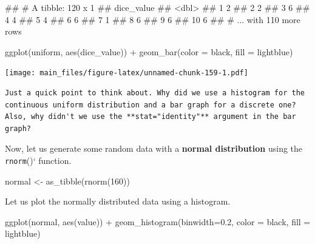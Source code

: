 \documentclass[
]{book}
\newenvironment{Shaded}{\begin{snugshade}}{\end{snugshade}}
\newcommand{\AttributeTok}[1]{\textcolor[rgb]{0.77,0.63,0.00}{#1}}
\newcommand{\DecValTok}[1]{\textcolor[rgb]{0.00,0.00,0.81}{#1}}
\newcommand{\FloatTok}[1]{\textcolor[rgb]{0.00,0.00,0.81}{#1}}
\newcommand{\FunctionTok}[1]{\textcolor[rgb]{0.00,0.00,0.00}{#1}}
\newcommand{\NormalTok}[1]{#1}
\newcommand{\OtherTok}[1]{\textcolor[rgb]{0.56,0.35,0.01}{#1}}
\newcommand{\SpecialCharTok}[1]{\textcolor[rgb]{0.00,0.00,0.00}{#1}}
\newcommand{\StringTok}[1]{\textcolor[rgb]{0.31,0.60,0.02}{#1}}
\begin{document}
\begin{Shaded}
\begin{Highlighting}[]
\NormalTok{\#\# \# A tibble: 120 x 1}
\NormalTok{\#\#    dice\_value}
\NormalTok{\#\#         \textless{}dbl\textgreater{}}
\NormalTok{\#\#  1          2}
\NormalTok{\#\#  2          2}
\NormalTok{\#\#  3          6}
\NormalTok{\#\#  4          4}
\NormalTok{\#\#  5          4}
\NormalTok{\#\#  6          6}
\NormalTok{\#\#  7          1}
\NormalTok{\#\#  8          6}
\NormalTok{\#\#  9          6}
\NormalTok{\#\# 10          6}
\NormalTok{\#\# \# ... with 110 more rows}
\end{Highlighting}
\end{Shaded}

\begin{Shaded}
\begin{Highlighting}[]
\FunctionTok{ggplot}\NormalTok{(uniform, }\FunctionTok{aes}\NormalTok{(dice\_value)) }\SpecialCharTok{+}
  \FunctionTok{geom\_bar}\NormalTok{(}\AttributeTok{color =} \StringTok{\textquotesingle{}black\textquotesingle{}}\NormalTok{,}
           \AttributeTok{fill =} \StringTok{\textquotesingle{}lightblue\textquotesingle{}}\NormalTok{)}
\end{Highlighting}
\end{Shaded}

\texttt{[image: main\_files/figure-latex/unnamed-chunk-159-1.pdf]}

\begin{verbatim}
Just a quick point to think about. Why did we use a histogram for the 
continuous uniform distribution and a bar graph for a discrete one? 
Also, why didn't we use the **stat="identity"** argument in the bar graph?
\end{verbatim}

Now, let us generate some random data with a \textbf{normal distribution} using the \texttt{rnorm}()` function.

\begin{Shaded}
\begin{Highlighting}[]
\NormalTok{normal }\OtherTok{\textless{}{-}} \FunctionTok{as\_tibble}\NormalTok{(}\FunctionTok{rnorm}\NormalTok{(}\DecValTok{160}\NormalTok{))}
\end{Highlighting}
\end{Shaded}

Let us plot the normally distributed data using a histogram.

\begin{Shaded}
\begin{Highlighting}[]
\FunctionTok{ggplot}\NormalTok{(normal, }\FunctionTok{aes}\NormalTok{(value)) }\SpecialCharTok{+}
        \FunctionTok{geom\_histogram}\NormalTok{(}\AttributeTok{binwidth=}\FloatTok{0.2}\NormalTok{,}
                       \AttributeTok{color =} \StringTok{\textquotesingle{}black\textquotesingle{}}\NormalTok{,}
                       \AttributeTok{fill =} \StringTok{\textquotesingle{}lightblue\textquotesingle{}}\NormalTok{)}
\end{Highlighting}
\end{Shaded}
\end{document}
